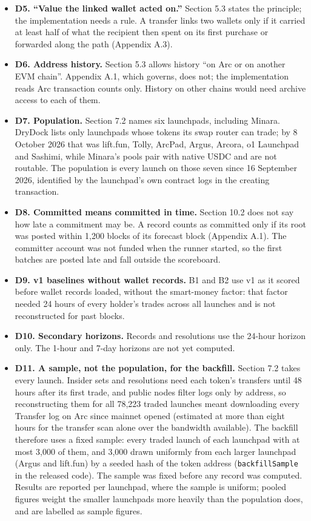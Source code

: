 \begin{itemize}
\item
  \textbf{D5. ``Value the linked wallet acted on.''} Section 5.3 states the principle; the implementation needs a rule. A transfer links two wallets only if it carried at least half of what the recipient then spent on its first purchase or forwarded along the path (Appendix A.3).
\item
  \textbf{D6. Address history.} Section 5.3 allows history ``on Arc or on another EVM chain''. Appendix A.1, which governs, does not; the implementation reads Arc transaction counts only. History on other chains would need archive access to each of them.
\item
  \textbf{D7. Population.} Section 7.2 names six launchpads, including Minara. DryDock lists only launchpads whose tokens its swap router can trade; by 8 October 2026 that was lift.fun, Tolly, ArcPad, Argus, Arcora, o1 Launchpad and Sashimi, while Minara's pools pair with native USDC and are not routable. The population is every launch on those seven since 16 September 2026, identified by the launchpad's own contract logs in the creating transaction.
\item
  \textbf{D8. Committed means committed in time.} Section 10.2 does not say how late a commitment may be. A record counts as committed only if its root was posted within 1,200 blocks of its forecast block (Appendix A.1). The committer account was not funded when the runner started, so the first batches are posted late and fall outside the scoreboard.
\item
  \textbf{D9. v1 baselines without wallet records.} B1 and B2 use v1 as it scored before wallet records loaded, without the smart-money factor: that factor needed 24 hours of every holder's trades across all launches and is not reconstructed for past blocks.
\item
  \textbf{D10. Secondary horizons.} Records and resolutions use the 24-hour horizon only. The 1-hour and 7-day horizons are not yet computed.
\item
  \textbf{D11. A sample, not the population, for the backfill.} Section 7.2 takes every launch. Insider sets and resolutions need each token's transfers until 48 hours after its first trade, and public nodes filter logs only by address, so reconstructing them for all 78,223 traded launches meant downloading every Transfer log on Arc since mainnet opened (estimated at more than eight hours for the transfer scan alone over the bandwidth available). The backfill therefore uses a fixed sample: every traded launch of each launchpad with at most 3,000 of them, and 3,000 drawn uniformly from each larger launchpad (Argus and lift.fun) by a seeded hash of the token address (\texttt{backfillSample} in the released code). The sample was fixed before any record was computed. Results are reported per launchpad, where the sample is uniform; pooled figures weight the smaller launchpads more heavily than the population does, and are labelled as sample figures.

\end{itemize}
